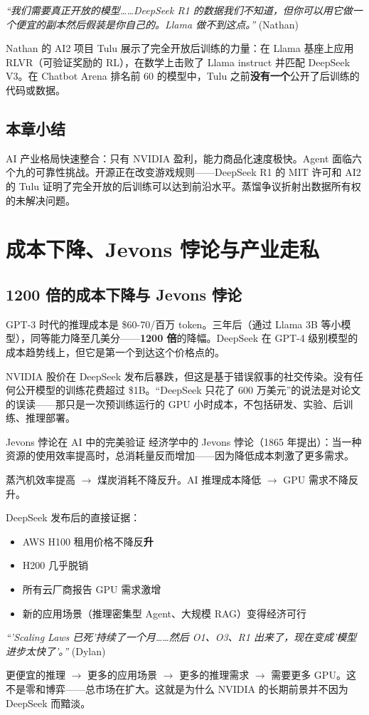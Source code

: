 \documentclass[a4paper]{article}
\begin{document}
\textit{``我们需要真正开放的模型……DeepSeek R1 的数据我们不知道，但你可以用它做一个便宜的副本然后假装是你自己的。Llama 做不到这点。''} (Nathan)

Nathan 的 AI2 项目 Tulu 展示了完全开放后训练的力量：在 Llama 基座上应用 RLVR（可验证奖励的 RL），在数学上击败了 Llama instruct 并匹配 DeepSeek V3。在 Chatbot Arena 排名前 60 的模型中，Tulu 之前\textbf{没有一个}公开了后训练的代码或数据。

\subsection{本章小结}

AI 产业格局快速整合：只有 NVIDIA 盈利，能力商品化速度极快。Agent 面临六个九的可靠性挑战。开源正在改变游戏规则——DeepSeek R1 的 MIT 许可和 AI2 的 Tulu 证明了完全开放的后训练可以达到前沿水平。蒸馏争议折射出数据所有权的未解决问题。

\section{成本下降、Jevons 悖论与产业走私}

\subsection{1200 倍的成本下降与 Jevons 悖论}

GPT-3 时代的推理成本是 \$60-70/百万 token。三年后（通过 Llama 3B 等小模型），同等能力降至几美分——\textbf{1200 倍}的降幅。DeepSeek 在 GPT-4 级别模型的成本趋势线上，但它是第一个到达这个价格点的。

NVIDIA 股价在 DeepSeek 发布后暴跌，但这是基于错误叙事的社交传染。没有任何公开模型的训练花费超过 \$1B。``DeepSeek 只花了 600 万美元''的说法是对论文的误读——那只是一次预训练运行的 GPU 小时成本，不包括研发、实验、后训练、推理部署。

\begin{importantbox}{Jevons 悖论在 AI 中的完美验证}
经济学中的 Jevons 悖论（1865 年提出）：当一种资源的使用效率提高时，总消耗量反而增加——因为降低成本刺激了更多需求。

蒸汽机效率提高 $\to$ 煤炭消耗不降反升。AI 推理成本降低 $\to$ GPU 需求不降反升。

DeepSeek 发布后的直接证据：
\begin{itemize}
    \item AWS H100 租用价格不降反\textbf{升}
    \item H200 几乎脱销
    \item 所有云厂商报告 GPU 需求激增
    \item 新的应用场景（推理密集型 Agent、大规模 RAG）变得经济可行
\end{itemize}

\textit{``'Scaling Laws 已死'持续了一个月……然后 O1、O3、R1 出来了，现在变成'模型进步太快了'。''} (Dylan)

更便宜的推理 $\to$ 更多的应用场景 $\to$ 更多的推理需求 $\to$ 需要更多 GPU。这不是零和博弈——总市场在扩大。这就是为什么 NVIDIA 的长期前景并不因为 DeepSeek 而黯淡。
\end{importantbox}
\end{document}
